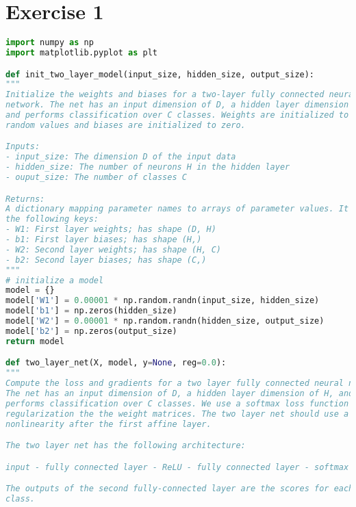 \chapter{Exercise 1}









\begin{lstlisting}[language=Python, label=lst:neuralnet.py, caption={neural\_net.py}, basicstyle=\tiny]
import numpy as np
import matplotlib.pyplot as plt

def init_two_layer_model(input_size, hidden_size, output_size):
"""
Initialize the weights and biases for a two-layer fully connected neural
network. The net has an input dimension of D, a hidden layer dimension of H,
and performs classification over C classes. Weights are initialized to small
random values and biases are initialized to zero.

Inputs:
- input_size: The dimension D of the input data
- hidden_size: The number of neurons H in the hidden layer
- ouput_size: The number of classes C

Returns:
A dictionary mapping parameter names to arrays of parameter values. It has
the following keys:
- W1: First layer weights; has shape (D, H)
- b1: First layer biases; has shape (H,)
- W2: Second layer weights; has shape (H, C)
- b2: Second layer biases; has shape (C,)
"""
# initialize a model
model = {}
model['W1'] = 0.00001 * np.random.randn(input_size, hidden_size)
model['b1'] = np.zeros(hidden_size)
model['W2'] = 0.00001 * np.random.randn(hidden_size, output_size)
model['b2'] = np.zeros(output_size)
return model

def two_layer_net(X, model, y=None, reg=0.0):
"""
Compute the loss and gradients for a two layer fully connected neural network.
The net has an input dimension of D, a hidden layer dimension of H, and
performs classification over C classes. We use a softmax loss function and L2
regularization the the weight matrices. The two layer net should use a ReLU
nonlinearity after the first affine layer.

The two layer net has the following architecture:

input - fully connected layer - ReLU - fully connected layer - softmax

The outputs of the second fully-connected layer are the scores for each
class.


\end{lstlisting}

